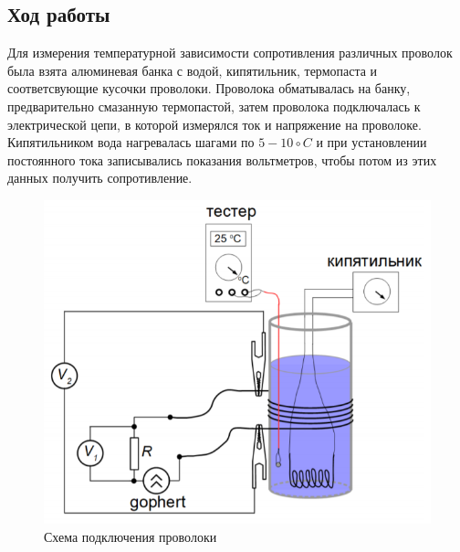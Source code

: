 \documentclass[a4paper,14pt]{extarticle}
\begin{document}
		\subsection{Ход работы}
		Для измерения температурной зависимости сопротивления различных проволок была взята алюминевая банка с водой, кипятильник, термопаста и соответсвующие кусочки проволоки. Проволока обматывалась на банку, предварительно смазанную термопастой, затем проволока подключалась к электрической цепи, в которой измерялся ток и напряжение на проволоке. Кипятильником вода нагревалась шагами по $5 - 10 \circ C$ и  при установлении постоянного тока записывались показания вольтметров, чтобы потом из этих данных получить сопротивление.
			\begin{figure}[h!]
				\centering
				\includegraphics[width=.55\linewidth]{Lab3_1.png}
				\caption{Схема подключения проволоки}
				\label{fig1}
			\end{figure}
		\newpage
\end{document}
